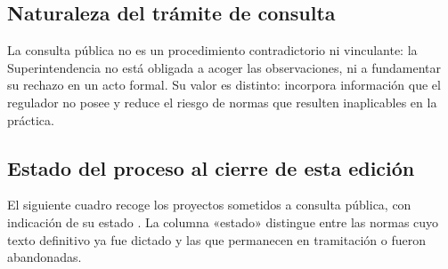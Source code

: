 \subsection{Naturaleza del trámite de consulta}

La consulta pública no es un procedimiento contradictorio ni vinculante: la
Superintendencia no está obligada a acoger las observaciones, ni a fundamentar su
rechazo en un acto formal. Su valor es distinto: incorpora información que el regulador
no posee y reduce el riesgo de normas que resulten inaplicables en la práctica.

\bloqueNormativo

\subsection{Estado del proceso al cierre de esta edición}

El siguiente cuadro recoge los proyectos sometidos a consulta pública, con indicación de
su estado \parencite{superir-normativa-tramite}. La columna «estado» distingue entre las
normas cuyo texto definitivo ya fue dictado y las que permanecen en tramitación o fueron
abandonadas.

